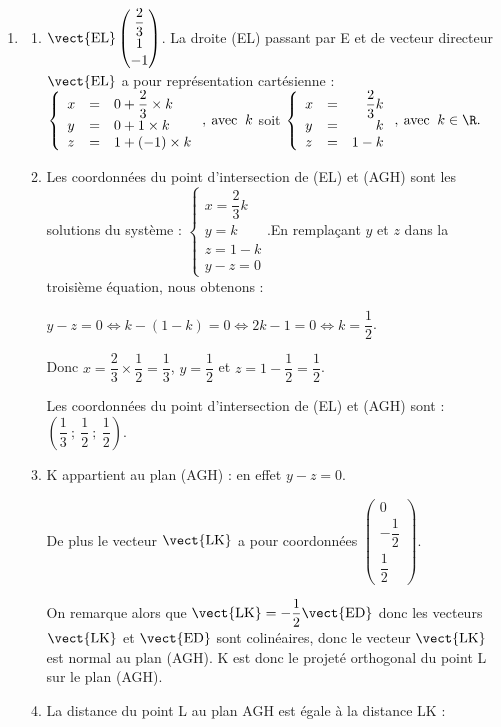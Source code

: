 \begin{enumerate}
		Or $\text{A}\in \text{(ART)}$ donc $0-0+d=0$ donc $d=0$. Donc (AGH) a pour équation $y - z = 0$.
		\item \begin{enumerate}
			\item $\vect{\text{EL}}\begin{pmatrix}\dfrac23\\1\\-1\end{pmatrix}$. La droite (EL) passant par E et de vecteur directeur $\vect{\text{EL}}$ a pour représentation cartésienne :
			$\left\{\begin{array}{l c l}x&=&0+\dfrac23\times k\\y&=&0 +1\times k\\z &=&1+(-1)\times k \end{array}\right.,\: \text{avec }\:k$ soit $\left\{\begin{array}{l c r}x&=&\dfrac23 k\\y&=&k\\z &=&1- k \end{array}\right.,\: \text{avec }\:k \in \R.$
			\item Les coordonnées du point d'intersection de (EL) et (AGH) sont les solutions du système : $\left\{\begin{array}{l}x=\dfrac23 k\\y=k\\z =1- k \\ y-z=0 \end{array}\right.$.En remplaçant $y$ et $z$ dans la troisième équation, nous obtenons :

$y-z=0  \iff  k-(1-k)=0  \iff  2k-1=0 \iff k=\dfrac12$. 

Donc $x=\dfrac23 \times \dfrac12=\dfrac13$, $y=\dfrac12$ et $z=1-\dfrac12=\dfrac12$.
			
Les coordonnées du point d'intersection de (EL) et (AGH) sont : $\left(\dfrac13~;~\dfrac12~;~\dfrac12\right)$.
			\item K appartient au plan (AGH) : en effet $y - z=0$.
			
De plus  le vecteur $\vect{\text{LK}}$ a pour coordonnées $\begin{pmatrix}0\\-\dfrac12\\\dfrac12\end{pmatrix}$.
			
On remarque alors que $\vect{\text{LK}}=-\dfrac12\vect{\text{ED}}$ donc les vecteurs $\vect{\text{LK}}$ et $\vect{\text{ED}}$ sont colinéaires, donc le vecteur $\vect{\text{LK}}$ est normal au plan (AGH). K est donc le projeté orthogonal du point L sur le plan (AGH).
			\item La distance du point L au plan AGH est égale à la distance LK :
			

\end{enumerate}
\end{enumerate}
